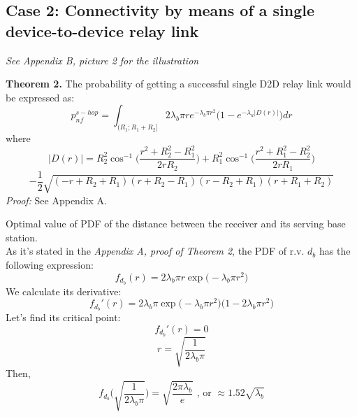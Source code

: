 \begin{comment}
https://en.wikipedia.org/wiki/Conditional_probability_distribution
https://en.wikipedia.org/wiki/Law_of_total_probability
\end{comment}

\subsection{Case 2: Connectivity by means of a single device-to-device relay link}
{\it See Appendix B, picture 2 for the illustration}

\begin {framed}
{\bf Theorem 2.}
The probability of getting a successful single D2D relay link would be expressed as:
\[p_{nf}^{s-hop}=\int_{(R_1;R_1+R_2]}2\lambda_b\pi re^{-\lambda_b\pi r^2}\Big(1-e^{-\lambda_u|D(r)|}\Big)dr\]
where
\[|D(r)|=R_2^2\cos^{-1}\Big(\frac{r^2+R_2^2-R_1^2}{2rR_2}\Big)+R_1^2\cos^{-1}\Big(\frac{r^2+R_1^2-R_2^2}{2rR_1}\Big)\]
\[-\frac{1}{2}\sqrt{(-r+R_2+R_1)(r+R_2-R_1)(r-R_2+R_1)(r+R_1+R_2)}\]
{\it Proof:}  See Appendix A.
\end {framed}

\begin {framed}
Optimal value of PDF of the distance between the receiver and its serving base station.
\\ As it's stated in the {\it Appendix A, proof of Theorem 2}, the PDF of r.v. \(d_b\) has the following expression:
\[f_{d_b}(r)=2\lambda_b\pi r\exp{\Big(-\lambda_b\pi r^2\Big)}\]
We calculate its derivative:
\[f_{d_b}'(r)=2\lambda_b\pi\exp{\Big(-\lambda_b\pi r^2\Big)}\Big(1-2\lambda_b\pi r^2\Big)\]
Let's find its critical point:
\[f_{d_b}'(r)=0\]
\[r=\sqrt{\frac {1}{2\lambda_b\pi}}\]
Then,
\[f_{d_b}\Big(\sqrt{\frac {1}{2\lambda_b\pi}}\Big)=\sqrt{\frac{2\pi\lambda_b}{e}}\text{ , or }\approx1.52\sqrt{\lambda_b}\]
\end {framed}
